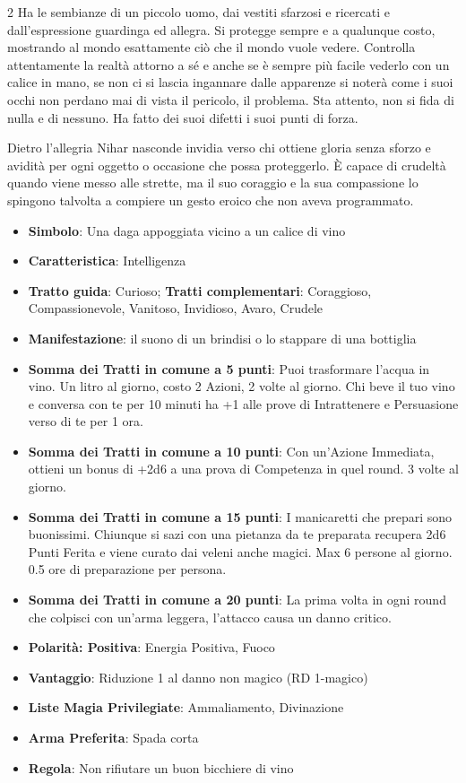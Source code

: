 \begin{multicols}{2}
Ha le sembianze di un piccolo uomo, dai vestiti sfarzosi e ricercati e dall'espressione guardinga ed allegra. Si protegge sempre e a qualunque costo, mostrando al mondo esattamente ciò che il mondo vuole vedere. Controlla attentamente la realtà attorno a sé e anche se è sempre più facile vederlo con un calice in mano, se non ci si lascia ingannare dalle apparenze si noterà come i suoi occhi non perdano mai di vista il pericolo, il problema. Sta attento, non si fida di nulla e di nessuno. Ha fatto dei suoi difetti i suoi punti di forza.

Dietro l'allegria Nihar nasconde invidia verso chi ottiene gloria senza sforzo e avidità per ogni oggetto o occasione che possa proteggerlo. È capace di crudeltà quando viene messo alle strette, ma il suo coraggio e la sua compassione lo spingono talvolta a compiere un gesto eroico che non aveva programmato.

\begin{itemize}[leftmargin=*] \setlength{\itemsep}{0pt}
\item \textbf{Simbolo}: Una daga appoggiata vicino a un calice di vino
\item \textbf{Caratteristica}: Intelligenza
\item \textbf{Tratto guida}: Curioso; \textbf{Tratti complementari}: Coraggioso, Compassionevole, Vanitoso, Invidioso, Avaro, Crudele
\item \textbf{Manifestazione}: il suono di un brindisi o lo stappare di una bottiglia
\item \textbf{Somma dei Tratti in comune a 5 punti}: Puoi trasformare l'acqua in vino. Un litro al giorno, costo 2 Azioni, 2 volte al giorno. Chi beve il tuo vino e conversa con te per 10 minuti ha +1 alle prove di Intrattenere e Persuasione verso di te per 1 ora.
\item \textbf{Somma dei Tratti in comune a 10 punti}: Con un'Azione Immediata, ottieni un bonus di +2d6 a una prova di Competenza in quel round. 3 volte al giorno.
\item \textbf{Somma dei Tratti in comune a 15 punti}: I manicaretti che prepari sono buonissimi. Chiunque si sazi con una pietanza da te preparata recupera 2d6 Punti Ferita e viene curato dai veleni anche magici. Max 6 persone al giorno. 0.5 ore di preparazione per persona.
\item \textbf{Somma dei Tratti in comune a 20 punti}: La prima volta in ogni round che colpisci con un'arma leggera, l'attacco causa un danno critico.
\item \textbf{Polarità: Positiva}: Energia Positiva, Fuoco
\item \textbf{Vantaggio}: Riduzione 1 al danno non magico (RD 1-magico)
\item \textbf{Liste Magia Privilegiate}: Ammaliamento, Divinazione
\item \textbf{Arma Preferita}: Spada corta
\item \textbf{Regola}: Non rifiutare un buon bicchiere di vino
\end{itemize}


\end{multicols}
